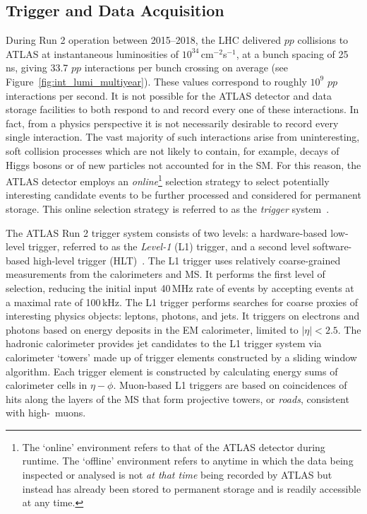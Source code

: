 \subsection{Trigger and Data Acquisition}
\label{sec:tdaq}

During Run 2 operation between 2015--2018, the LHC delivered $pp$ collisions to ATLAS at instantaneous luminosities of
$10^{34}$\,cm$^{-2}$s$^{-1}$, at a bunch spacing of 25\,ns, giving 33.7 $pp$ interactions per bunch crossing on average
(see Figure~\ref{fig:int_lumi_multiyear}).
These values correspond to roughly $10^9$ $pp$ interactions per second.
It is not possible for the ATLAS detector and data storage facilities to both respond to and record every one of these interactions.
In fact, from a physics perspective it is not necessarily desirable to record every single interaction.
The vast majority of such interactions arise from uninteresting, soft collision processes which are not likely
to contain, for example, decays of Higgs bosons or of new particles not accounted for in the SM.
For this reason, the ATLAS detector employs an \textit{online}\footnote{The `online' environment refers to that of the
ATLAS detector during runtime. The `offline' environment refers to anytime in which the data being inspected
or analysed is not \textit{at that time} being recorded by ATLAS but instead has already been stored to permanent storage
and is readily accessible at any time.}
selection strategy to select potentially interesting candidate events to be further processed and considered
for permanent storage. This online selection strategy is referred to as the \textit{trigger} system~\cite{Jenni:616089}.

The ATLAS Run 2 trigger system consists of two levels: a hardware-based low-level
trigger, referred to as the \textit{Level-1} (L1) trigger, and a second level software-based high-level trigger (HLT)~\cite{PanduroVazquez:2244345}.
The L1 trigger uses relatively coarse-grained measurements from the calorimeters and MS.
It performs the first level of selection, reducing the initial input 40\,MHz rate of events by
accepting events at a maximal rate of 100\,kHz.
The L1 trigger performs searches for coarse proxies of interesting physics objects: leptons, photons, and jets.
It triggers on electrons and photons based on energy deposits in the EM calorimeter, limited to $\lvert \eta \rvert < 2.5$.
The hadronic calorimeter provides jet candidates to the L1 trigger system via calorimeter `towers' made up of
trigger elements constructed by a sliding window algorithm.
Each trigger element is constructed by calculating energy sums of calorimeter cells in $\eta - \phi$.
Muon-based L1 triggers are based on coincidences of hits along the layers of the MS that form
projective towers, or \textit{roads}, consistent with high-\pT~muons.

